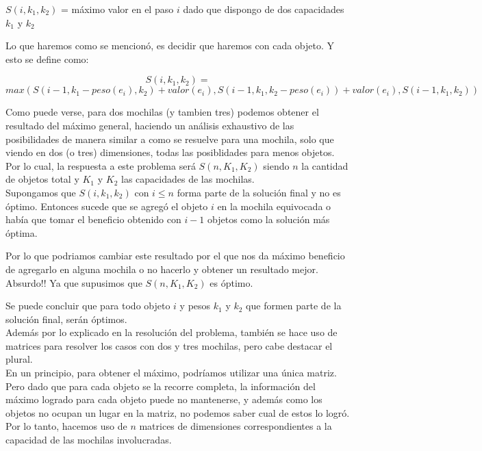 \begin{center}
$S(i, k_1, k_2)$ = máximo valor en el paso $i$ dado que dispongo de dos capacidades $k_1$ y $k_2$
\end{center}

Lo que haremos como se mencionó, es decidir que haremos con cada objeto. Y esto se define como:

\begin{equation}
S(i, k_1, k_2) = 
\end{equation}
\begin{equation}
max(S(i-1, k_1-peso(e_i), k_2)+valor(e_i), 
        S(i-1, k_1, k_2-peso(e_i))+valor(e_i), 
        S(i-1, k_1, k_2))
\end{equation}

Como puede verse, para dos mochilas (y tambien tres) podemos obtener el resultado del máximo general, haciendo un análisis exhaustivo de las posibilidades de manera similar a como se resuelve para una mochila, solo que viendo en dos (o tres) dimensiones, todas las posiblidades para menos objetos.\\
Por lo cual, la respuesta a este problema será $S(n, K_1, K_2)$ siendo $n$ la cantidad de objetos total y $K_1$ y $K_2$ las capacidades de las mochilas.\\

Supongamos que $S(i, k_1, k_2)$ con $i \leq n$ forma parte de la solución final y no es óptimo. Entonces sucede que se agregó el objeto $i$ en la mochila equivocada o había que tomar el beneficio obtenido con $i-1$ objetos como la solución más óptima. 

Por lo que podriamos cambiar este resultado por el que nos da máximo beneficio de agregarlo en alguna mochila o no hacerlo y obtener un resultado mejor. Absurdo!! Ya que supusimos que $S(n, K_1, K_2)$ es óptimo.

Se puede concluir que para todo objeto $i$ y pesos $k_1$ y $k_2$ que formen parte de la solución final, serán óptimos.\\

Además por lo explicado en la resolución del problema, tambi\'en se hace uso de matrices para resolver los casos con dos y tres mochilas, pero cabe destacar el plural. \\

En un principio, para obtener el máximo, podr\'iamos utilizar una única matriz. Pero dado que para cada objeto se la recorre completa, la información del máximo logrado para cada objeto puede no mantenerse, y además como los objetos no ocupan un lugar en la matriz, no podemos saber cual de estos lo logró.\\
Por lo tanto, hacemos uso de $n$ matrices de dimensiones correspondientes a la capacidad de las mochilas involucradas. \\

